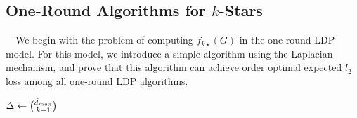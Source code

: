 \subsection{One-Round Algorithms for $k$-Stars}
\label{sub:non-interactive_k_stars}

~~We begin with the problem of computing $f_{k\star}(G)$ in the 
one-round 
LDP model. 
For this model, we introduce a simple algorithm using the Laplacian mechanism, and prove that this algorithm can achieve order optimal expected $l_2$ loss among all one-round LDP algorithms. 

\setlength{\algomargin}{4mm}
\begin{algorithm}
  \SetAlgoLined
  $\Delta \leftarrow \binom{\tilde{d}_{max}}{k-1}$\;
  \caption{\label{alg:k-stars}}
\end{algorithm}


